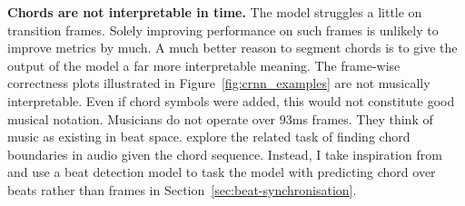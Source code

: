 \textbf{Chords are not interpretable in time.} The model struggles a little on transition frames. Solely improving performance on such frames is unlikely to improve metrics by much. A much better reason to segment chords is to give the output of the model a far more interpretable meaning. The frame-wise correctness plots illustrated in Figure~\ref{fig:crnn_examples} are not musically interpretable. Even if chord symbols were added, this would not constitute good musical notation. Musicians do not operate over $93$ms frames. They think of music as existing in beat space. \citet{AlignmentChordAnnotations} explore the related task of finding chord boundaries in audio given the chord sequence. Instead, I take inspiration from \citet{MelodyTranscriptionViaGenerativePreTraining} and use a beat detection model to task the model with predicting chord over beats rather than frames in Section~\ref{sec:beat-synchronisation}. 
